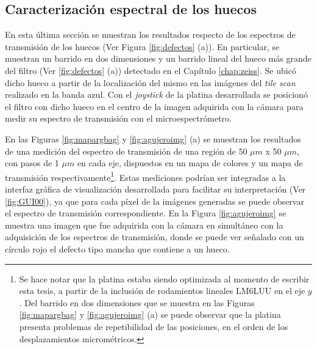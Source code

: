 \singlespacing
\subsection{Caracterización espectral de los huecos}
\label{sec:defctag}

\hspace{0.5cm}En esta última sección se muestran los resultados respecto de los espectros de transmisión de los huecos (Ver Figura \ref{fig:defectos} (a)). En particular, se muestran un barrido en dos dimensiones y un barrido lineal del hueco más grande del filtro (Ver \ref{fig:defectos} (a)) detectado en el Capítulo \ref{chap:zeiss}. Se ubicó dicho hueco a partir de la localización del mismo en las imágenes del \textit{tile scan} realizado en la banda azul. Con el \textit{joystick} de la platina desarrollada se posicionó el filtro con dicho hueco en el centro de la imagen adquirida con la cámara para medir su espectro de transmisión con el microespectrómetro.

En las Figuras \ref{fig:mapargbag} y \ref{fig:agujeroimg} (a) se muestran los resultados de una medición del espectro de transmisión de una región de 50 $\mu m$ x 50 $\mu m$, con pasos de 1 $\mu m$ en cada eje, dispuestos en un mapa de colores y un mapa de transmisión respectivamente\footnote{Se hace notar que la platina estaba siendo optimizada al momento de escribir esta tesis, a partir de la inclusión de rodamientos lineales LM6LUU en el eje \textit{$y$}. Del barrido en dos dimensiones que se muestra en las Figuras \ref{fig:mapargbag} y \ref{fig:agujeroimg} (a) se puede observar que la platina presenta problemas de repetibilidad de las posiciones, en el orden de los desplazamientos micrométricos.}. Estas mediciones podrían ser integradas a la interfaz gráfica de visualización desarrollada para facilitar su interpretación (Ver \ref{fig:GUI00}), ya que para cada píxel de la imágenes generadas se puede observar el espectro de transmisión correspondiente. En la Figura \ref{fig:agujeroimg} se muestra una imagen que fue adquirida con la cámara en simultáneo con la adquisición de los espectros de transmisión, donde se puede ver señalado con un círculo rojo el defecto tipo mancha que contiene a un hueco.

